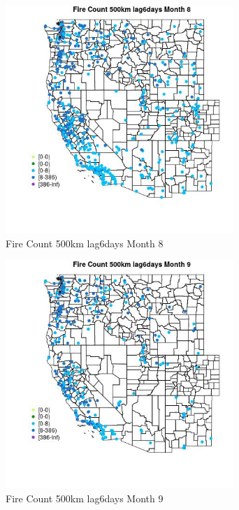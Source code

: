 \begin{figure} 
\centering  
\includegraphics[width=0.77\textwidth]{Code_Outputs/Report_ML_input_PM25_Step4_part_e_de_duplicated_aves_compiled_2019-05-18wNAs_MapObsMo8Fire_Count_500km_lag6days.jpg} 
\caption{\label{fig:Report_ML_input_PM25_Step4_part_e_de_duplicated_aves_compiled_2019-05-18wNAsMapObsMo8Fire_Count_500km_lag6days}Fire Count 500km lag6days Month 8} 
\end{figure} 
 

\begin{figure} 
\centering  
\includegraphics[width=0.77\textwidth]{Code_Outputs/Report_ML_input_PM25_Step4_part_e_de_duplicated_aves_compiled_2019-05-18wNAs_MapObsMo9Fire_Count_500km_lag6days.jpg} 
\caption{\label{fig:Report_ML_input_PM25_Step4_part_e_de_duplicated_aves_compiled_2019-05-18wNAsMapObsMo9Fire_Count_500km_lag6days}Fire Count 500km lag6days Month 9} 
\end{figure} 
 

